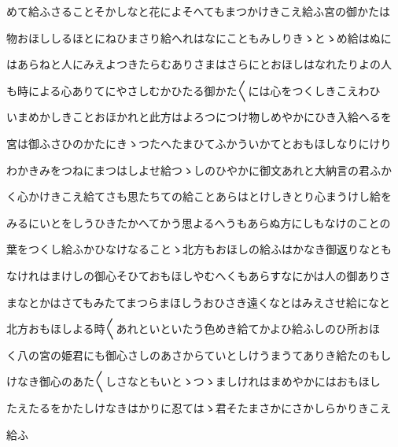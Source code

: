 \documentclass[a4paper,11pt,landscape]{ltjtarticle}
\begin{document}
\par\medskip
めて給ふさることそかしなと花によそへてもまつかけきこえ給ふ宮の御かたは
\par\medskip
物おほししるほとにねひまさり給へれはなにこともみしりきゝとゝめ給はぬに
\par\medskip
はあらねと人にみえよつきたらむありさまはさらにとおほしはなれたりよの人
\par\medskip
も時による心ありてにやさしむかひたる御かた〱には心をつくしきこえわひ
\par\medskip
いまめかしきことおほかれと此方はよろつにつけ物しめやかにひき入給へるを
\par\medskip
宮は御ふさひのかたにきゝつたへたまひてふかういかてとおもほしなりにけり
\par\medskip
わかきみをつねにまつはしよせ給つゝしのひやかに御文あれと大納言の君ふか
\par\medskip
く心かけきこえ給てさも思たちての給ことあらはとけしきとり心まうけし給を
\par\medskip
みるにいとをしうひきたかへてかう思よるへうもあらぬ方にしもなけのことの
\par\medskip
葉をつくし給ふかひなけなることゝ北方もおほしの給ふはかなき御返りなとも
\par\medskip
なけれはまけしの御心そひておもほしやむへくもあらすなにかは人の御ありさ
\par\medskip
まなとかはさてもみたてまつらまほしうおひさき遠くなとはみえさせ給になと
\par\medskip
北方おもほしよる時〱あれといといたう色めき給てかよひ給ふしのひ所おほ
\par\medskip
く八の宮の姫君にも御心さしのあさからていとしけうまうてありき給たのもし
\par\medskip
けなき御心のあた〱しさなともいとゝつゝましけれはまめやかにはおもほし
\par\medskip
たえたるをかたしけなきはかりに忍てはゝ君そたまさかにさかしらかりきこえ
\par\medskip
給ふ
\par\medskip
\end{document}
